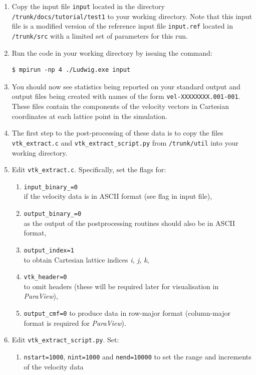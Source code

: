 \documentclass[11pt,twoside,a4paper]{article}
\begin{document}
\begin{enumerate}
\item Copy the input file \texttt{input} located in the directory \texttt{/trunk/docs/tutorial/test1} 
to your working directory. Note that this input file is a modified version of the 
reference input file \texttt{input.ref} located in \texttt{/trunk/src} with a limited set of parameters
for this run. 
\item Run the code in your working directory by issuing the command:
\begin{lstlisting}
$ mpirun -np 4 ./Ludwig.exe input
\end{lstlisting}
\item You should now see statistics being reported on your standard output and 
output files being created with names of the form \texttt{vel-XXXXXXXX.001-001}. 
These files contain the components of the velocity vectors in Cartesian coordinates at each lattice point in the simulation. 
\item The first step to the post-processing of these data is to copy the files \texttt{vtk\_extract.c} 
and \texttt{vtk\_extract\_script.py} from \texttt{/trunk/util} into your working directory.
\item Edit \texttt{vtk\_extract.c}. Specifically, set the flags for:
\begin{enumerate}
\item \texttt{input\_binary\_=0} \\ if the velocity data is in ASCII format (see flag in input file),
\item \texttt{output\_binary\_=0} \\ as the output of the postprocessing routines should also be in ASCII format,
\item \texttt{output\_index=1} \\ to obtain Cartesian lattice indices \textit{i, j, k}, 
\item \texttt{vtk\_header=0} \\ to omit headers (these will be required later for visualisation in \textit{ParaView}),
\item \texttt{output\_cmf=0} to produce data in row-major format (column-major format is required for \textit{ParaView}).
\end{enumerate}
\item Edit \texttt{vtk\_extract\_script.py}. Set:
\begin{enumerate}
\item \texttt{nstart=1000}, \texttt{nint=1000} and \texttt{nend=10000} to set the range and increments of the velocity data

\end{enumerate}
\end{enumerate}
\end{document}
